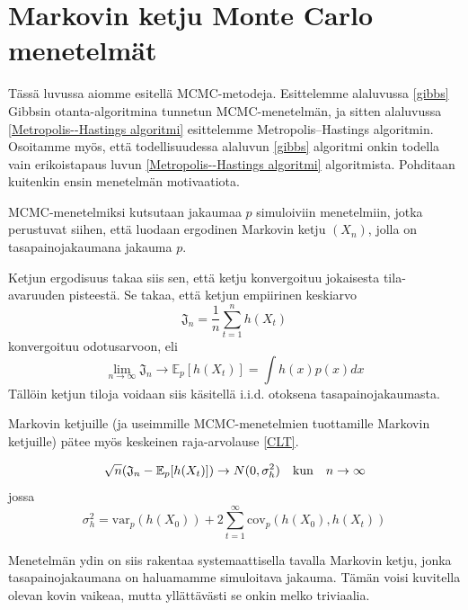 \chapter{Markovin ketju Monte Carlo menetelmät}

Tässä luvussa aiomme esitellä MCMC-metodeja. Esittelemme alaluvussa \ref{gibbs} Gibbsin otanta-algoritmina tunnetun MCMC-menetelmän, ja sitten alaluvussa \ref{Metropolis--Hastings algoritmi} esittelemme Metropolis--Hastings algoritmin. Osoitamme myös, että todellisuudessa alaluvun \ref{gibbs} algoritmi onkin todella vain erikoistapaus luvun \ref{Metropolis--Hastings algoritmi} algoritmista. Pohditaan kuitenkin ensin menetelmän motivaatiota. \cite[s.~94]{koistinen_computational_2009} \cite[s.~269]{monte_carlo_book}
 
\begin{maar}
	MCMC-menetelmiksi kutsutaan jakaumaa $p$ simuloiviin menetelmiin, jotka perustuvat siihen, että luodaan ergodinen Markovin ketju $(X_n)$, jolla on tasapainojakaumana jakauma $p$.
\end{maar}

Ketjun ergodisuus takaa siis sen, että ketju konvergoituu jokaisesta tila-avaruuden pisteestä. Se takaa, että ketjun empiirinen keskiarvo
\begin{equation}
	\mathfrak{J}_n = \frac{1}{n} \sum_{t=1}^{n} h(X_t)
\end{equation}
konvergoituu odotusarvoon, eli
\begin{equation}
	\lim_{n\to\infty} \mathfrak J_n \to \mathbb{E}_p[h(X_t)] = \int h(x)p(x)dx
\end{equation}
Tällöin ketjun tiloja voidaan siis käsitellä i.i.d. otoksena tasapainojakaumasta.

Markovin ketjuille (ja useimmille MCMC-menetelmien tuottamille Markovin ketjuille) pätee myös keskeinen raja-arvolause \ref{CLT}.

\begin{equation}\label{CLT}
	\sqrt{n}\qty(\mathfrak{J}_n-\mathbb{E}_p[h(X_t)]) \to N(0, \sigma^2_h) \qq{kun} n\to\infty
\end{equation}
jossa 
\begin{equation}
	\sigma^2_h = \text{var}_p(h(X_0))+2\sum_{t=1}^{\infty}\text{cov}_p(h(X_0),h(X_t))
\end{equation}

Menetelmän ydin on siis rakentaa systemaattisella tavalla Markovin ketju, jonka tasapainojakaumana on haluamamme simuloitava jakauma. Tämän voisi kuvitella olevan kovin vaikeaa, mutta yllättävästi se onkin melko triviaalia.

